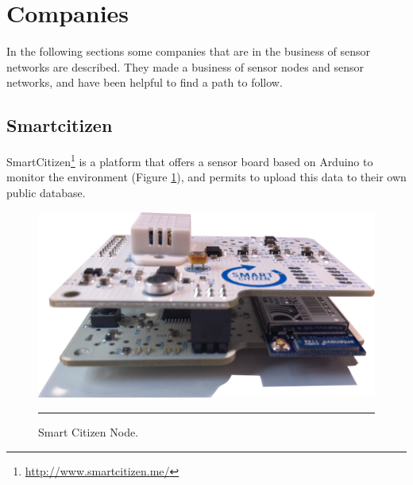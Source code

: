 \documentclass[12pt, a4paper,twoside]{tesi_upf}
\begin{document}
  \section{Companies}
    In the following sections some companies that are in the business of sensor networks are described. They made a business of sensor nodes and sensor networks, and have been helpful to find a path to follow.
    
    \subsection{Smartcitizen}
      SmartCitizen\footnote{\url{http://www.smartcitizen.me/}} is a platform that offers a sensor board based on Arduino to monitor the environment (Figure \ref{fig:SmartCitizenNode}), and permits to upload this data to their own public database.
      
      \begin{figure}[htbp]
        \centering
            \includegraphics[scale=0.08]{./Figures/smartcitizen.png}
            \rule{18em}{0.5pt}
        \caption[Smart Citizen Node]{Smart Citizen Node.}
        \label{fig:SmartCitizenNode}
    \end{figure}
            
\end{document}

